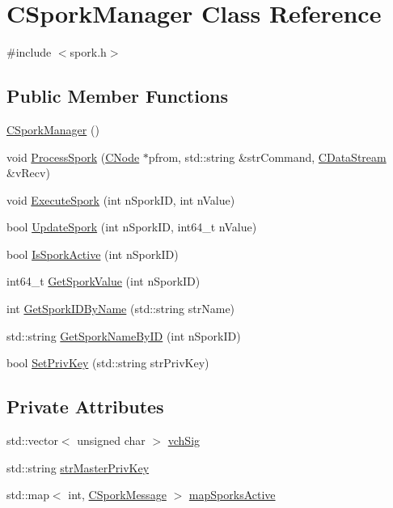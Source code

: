\hypertarget{class_c_spork_manager}{}\section{C\+Spork\+Manager Class Reference}
\label{class_c_spork_manager}


{\ttfamily \#include $<$spork.\+h$>$}

\subsection*{Public Member Functions}
\begin{DoxyCompactItemize}
\item 
\mbox{\hyperlink{class_c_spork_manager_af25ba284196ede7288bc9855e7f8a8a5}{C\+Spork\+Manager}} ()
\item 
void \mbox{\hyperlink{class_c_spork_manager_a8df4572333ec2ba0ec49b7a70eb4ae8a}{Process\+Spork}} (\mbox{\hyperlink{class_c_node}{C\+Node}} $\ast$pfrom, std\+::string \&str\+Command, \mbox{\hyperlink{class_c_data_stream}{C\+Data\+Stream}} \&v\+Recv)
\item 
void \mbox{\hyperlink{class_c_spork_manager_ade3cee4d73664c03ceaa900efeedc395}{Execute\+Spork}} (int n\+Spork\+ID, int n\+Value)
\item 
bool \mbox{\hyperlink{class_c_spork_manager_afb7e15fe29bd548939657a20ca5feafb}{Update\+Spork}} (int n\+Spork\+ID, int64\+\_\+t n\+Value)
\item 
bool \mbox{\hyperlink{class_c_spork_manager_a97d20d530b500c013e8bc8649ee13daf}{Is\+Spork\+Active}} (int n\+Spork\+ID)
\item 
int64\+\_\+t \mbox{\hyperlink{class_c_spork_manager_ac02210f3ce7c779421aeed383c3f6e6c}{Get\+Spork\+Value}} (int n\+Spork\+ID)
\item 
int \mbox{\hyperlink{class_c_spork_manager_ae72689cf7a2e87ef57f8f7e875a5c21d}{Get\+Spork\+I\+D\+By\+Name}} (std\+::string str\+Name)
\item 
std\+::string \mbox{\hyperlink{class_c_spork_manager_a810b34b5dd3a709cb0e265f155e0b551}{Get\+Spork\+Name\+By\+ID}} (int n\+Spork\+ID)
\item 
bool \mbox{\hyperlink{class_c_spork_manager_a599d088218de9d242e4dc5cb17dd310b}{Set\+Priv\+Key}} (std\+::string str\+Priv\+Key)
\end{DoxyCompactItemize}
\subsection*{Private Attributes}
\begin{DoxyCompactItemize}
\item 
std\+::vector$<$ unsigned char $>$ \mbox{\hyperlink{class_c_spork_manager_a5ae0ef66c2d2c1db5554494f91317c0b}{vch\+Sig}}
\item 
std\+::string \mbox{\hyperlink{class_c_spork_manager_a19c054c477f3131a2d52c907a71bf234}{str\+Master\+Priv\+Key}}
\item 
std\+::map$<$ int, \mbox{\hyperlink{class_c_spork_message}{C\+Spork\+Message}} $>$ \mbox{\hyperlink{class_c_spork_manager_a46533ed5fc6386662995932f688f23db}{map\+Sporks\+Active}}
\end{DoxyCompactItemize}


